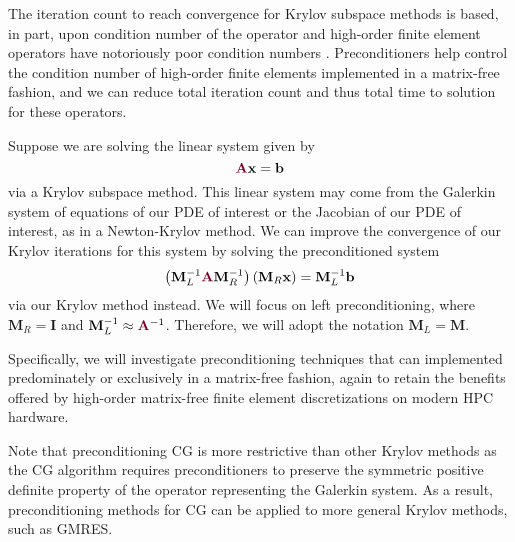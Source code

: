 The iteration count to reach convergence for Krylov subspace methods is based, in part, upon condition number of the operator \cite{luenberger1973introduction} and high-order finite element operators have notoriously poor condition numbers \cite{hu1998bounds}.
Preconditioners help control the condition number of high-order finite elements implemented in a matrix-free fashion, and we can reduce total iteration count and thus total time to solution for these operators.

Suppose we are solving the linear system given by
\begin{equation}
{\color{burgundy}\mathbf{A}} \mathbf{x} = \mathbf{b}
\label{linear_eqn}
\end{equation}
via a Krylov subspace method.
This linear system may come from the Galerkin system of equations of our PDE of interest or the Jacobian of our PDE of interest, as in a Newton-Krylov method.
We can improve the convergence of our Krylov iterations for this system by solving the preconditioned system
\begin{equation}
\left( \mathbf{M}_L^{-1} {\color{burgundy}\mathbf{A}} \mathbf{M}_R^{-1} \right) \left( \mathbf{M}_R \mathbf{x} \right) = \mathbf{M}_L^{-1} \mathbf{b}
\label{precond_eqn}
\end{equation}
via our Krylov method instead.
We will focus on left preconditioning, where $\mathbf{M}_R = \mathbf{I}$ and $\mathbf{M}_L^{-1} \approx {\color{burgundy}\mathbf{A}}^{-1}$.
Therefore, we will adopt the notation $\mathbf{M}_L = \mathbf{M}$.

Specifically, we will investigate preconditioning techniques that can implemented predominately or exclusively in a matrix-free fashion, again to retain the benefits offered by high-order matrix-free finite element discretizations on modern HPC hardware.

Note that preconditioning CG is more restrictive than other Krylov methods as the CG algorithm requires preconditioners to preserve the symmetric positive definite property of the operator representing the Galerkin system.
As a result, preconditioning methods for CG can be applied to more general Krylov methods, such as GMRES.
